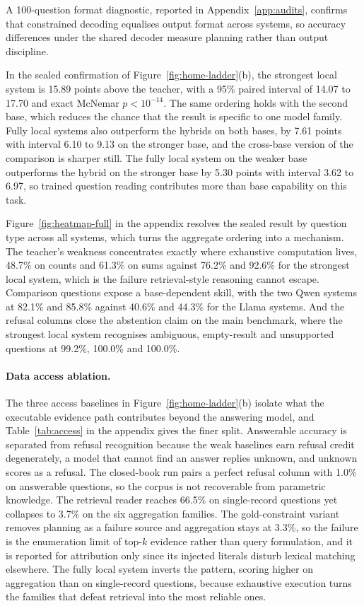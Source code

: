 \documentclass{article}
\begin{document}
A 100-question format diagnostic, reported in Appendix~\ref{app:audits},
confirms that constrained decoding equalises output format across systems,
so accuracy differences under the shared decoder measure planning rather
than output discipline.

In the sealed confirmation of Figure~\ref{fig:home-ladder}(b), the
strongest local system is
15.89 points above the teacher, with a 95\% paired interval of 14.07 to 17.70
and exact McNemar $p<10^{-14}$. The same ordering holds with the second base,
which reduces the chance that the result is specific to one model family.
Fully local systems also outperform the hybrids on both bases, by 7.61
points with interval 6.10 to 9.13 on the stronger base, and the cross-base
version of the comparison is sharper still. The fully local system on the
weaker base outperforms the hybrid on the stronger base by 5.30 points with
interval 3.62 to 6.97, so trained question reading contributes more than
base capability on this task.

Figure~\ref{fig:heatmap-full} in the appendix resolves the sealed result
by question type across all systems, which turns the aggregate ordering
into a mechanism. The teacher's
weakness concentrates exactly where exhaustive computation lives, 48.7\%
on counts and 61.3\% on sums against 76.2\% and 92.6\% for the strongest
local system, which is the failure retrieval-style reasoning cannot
escape. Comparison questions expose a base-dependent skill, with the two
Qwen systems at 82.1\% and 85.8\% against 40.6\% and 44.3\% for the Llama
systems. And the refusal columns close the abstention claim on the main
benchmark, where the strongest local system recognises ambiguous,
empty-result and unsupported questions at 99.2\%, 100.0\% and 100.0\%.

\paragraph{Data access ablation.}
The three access baselines in Figure~\ref{fig:home-ladder}(b) isolate
what the executable evidence path contributes beyond the answering model,
and Table~\ref{tab:access} in the appendix gives the finer split.
Answerable accuracy is separated from
refusal recognition because the weak baselines earn refusal credit
degenerately, a model that cannot find an answer replies unknown, and
unknown scores as a refusal. The closed-book run pairs a perfect refusal
column with 1.0\% on answerable questions, so the corpus is not
recoverable from parametric knowledge. The retrieval reader reaches
66.5\% on single-record questions yet collapses to 3.7\% on the six
aggregation families. The gold-constraint variant removes planning as a
failure source and aggregation stays at 3.3\%, so the failure is the
enumeration limit of top-$k$ evidence rather than query formulation, and
it is reported for attribution only since its injected literals disturb
lexical matching elsewhere. The fully local system inverts the pattern,
scoring higher on aggregation than on single-record questions, because
exhaustive execution turns the families that defeat retrieval into the
most reliable ones.
\end{document}
